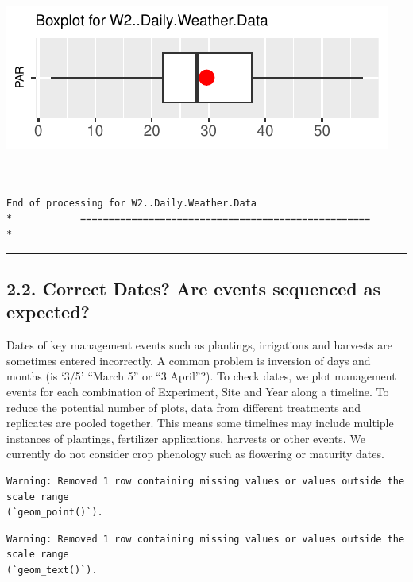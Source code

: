 \documentclass[
]{article}
\begin{document}
\includegraphics{FL_Crop_BMP_QA_single_dataset_files/figure-latex/check-content-of-sheets-66.pdf}

\begin{verbatim}


End of processing for W2..Daily.Weather.Data
*            ===================================================            *
\end{verbatim}

\begin{center}\rule{0.5\linewidth}{0.5pt}\end{center}

\subsection{2.2. Correct Dates? Are events sequenced as
expected?}\label{correct-dates-are-events-sequenced-as-expected}

Dates of key management events such as plantings, irrigations and
harvests are sometimes entered incorrectly. A common problem is
inversion of days and months (is `3/5' ``March 5'' or ``3 April''?). To
check dates, we plot management events for each combination of
Experiment, Site and Year along a timeline. To reduce the potential
number of plots, data from different treatments and replicates are
pooled together. This means some timelines may include multiple
instances of plantings, fertilizer applications, harvests or other
events. We currently do not consider crop phenology such as flowering or
maturity dates.

\begin{verbatim}
Warning: Removed 1 row containing missing values or values outside the scale range
(`geom_point()`).
\end{verbatim}

\begin{verbatim}
Warning: Removed 1 row containing missing values or values outside the scale range
(`geom_text()`).
\end{verbatim}
\end{document}
